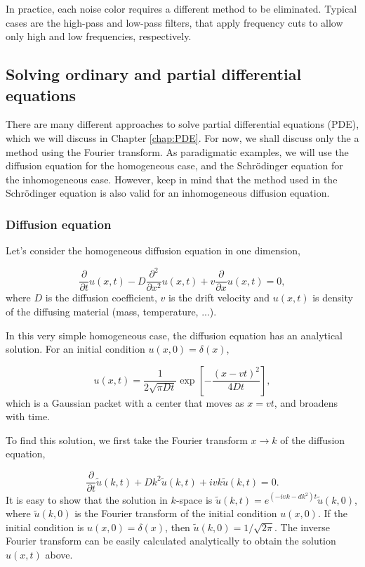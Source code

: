 In practice, each noise color requires a different method to be eliminated. Typical cases are the high-pass and low-pass filters, that apply frequency cuts to allow only high and low frequencies, respectively. 

\subsection{Solving ordinary and partial differential equations}
\label{sec:fourierPDE}

There are many different approaches to solve partial differential equations (PDE), which we will discuss in Chapter \ref{chap:PDE}. For now, we shall discuss only the a method using the Fourier transform. As paradigmatic examples, we will use the diffusion equation for the homogeneous case, and the Schrödinger equation for the inhomogeneous case. However, keep in mind that the method used in the Schrödinger equation is also valid for an inhomogeneous diffusion equation.

\subsubsection{Diffusion equation}

Let's consider the homogeneous diffusion equation in one dimension,

\begin{equation}
 \dfrac{\partial}{\partial t}u(x,t) - D \dfrac{\partial^2}{\partial x^2}u(x,t) + v \dfrac{\partial}{\partial x} u(x,t) = 0,
\end{equation}
where $D$ is the diffusion coefficient, $v$ is the drift velocity and $u(x,t)$ is density of the diffusing material (mass, temperature, ...).

In this very simple homogeneous case, the diffusion equation has an analytical solution. For an initial condition $u(x,0) = \delta(x)$,

\begin{equation}
 u(x,t) = \dfrac{1}{2\sqrt{\pi D t}}\exp \left[-\dfrac{(x-vt)^2}{4 D t}\right],
\end{equation}
which is a Gaussian packet with a center that moves as $x = vt$, and broadens with time.

To find this solution, we first take the Fourier transform $x \rightarrow k$ of the diffusion equation,

\begin{equation}
 \dfrac{\partial}{\partial t}\tilde{u}(k,t) + D k^2 \tilde{u}(k,t) + i v k \tilde{u}(k,t) = 0.
\end{equation}
It is easy to show that the solution in $k$-space is $\tilde{u}(k,t) = e^{(-ivk-dk^2)t}\tilde{u}(k,0)$, where $\tilde{u}(k,0)$ is the Fourier transform of the initial condition $u(x,0)$. If the initial condition is $u(x,0) = \delta(x)$, then $\tilde{u}(k,0) = 1/\sqrt{2\pi}$. The inverse Fourier transform can be easily calculated analytically to obtain the solution $u(x,t)$ above.

